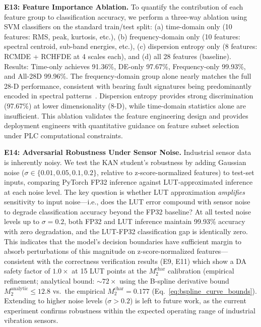 \documentclass[journal,onecolumn]{IEEEtran}
\begin{document}
\noindent\textbf{E13: Feature Importance Ablation.} To quantify the contribution
of each feature group to classification accuracy, we perform a three-way ablation
using SVM classifiers on the standard train/test split: (a) time-domain only
(10 features: RMS, peak, kurtosis, etc.), (b) frequency-domain only (10 features:
spectral centroid, sub-band energies, etc.), (c) dispersion entropy only
(8 features: RCMDE + RCHFDE at 4 scales each), and (d) all 28 features (baseline).
Results: Time-only achieves 91.36\%, DE-only 97.67\%, Frequency-only 99.93\%,
and All-28D 99.96\%. The frequency-domain group alone nearly matches the full
28-D performance, consistent with bearing fault signatures being predominantly
encoded in spectral patterns~\cite{zhang2017wdcnn}. Dispersion entropy provides
strong discrimination (97.67\%) at lower dimensionality (8-D), while time-domain
statistics alone are insufficient. This ablation validates the feature engineering
design and provides deployment engineers with quantitative guidance on feature
subset selection under PLC computational constraints.

\noindent\textbf{E14: Adversarial Robustness Under Sensor Noise.} Industrial
sensor data is inherently noisy. We test the KAN student's robustness by
adding Gaussian noise ($\sigma \in \{0.01, 0.05, 0.1, 0.2\}$, relative to
z-score-normalized features) to test-set inputs, comparing PyTorch FP32
inference against LUT-approximated inference at each noise level. The key
question is whether LUT approximation \textit{amplifies} sensitivity to input
noise---i.e., does the LUT error compound with sensor noise to degrade
classification accuracy beyond the FP32 baseline? At all tested noise levels
up to $\sigma = 0.2$, both FP32 and LUT inference maintain 99.93\% accuracy
with zero degradation, and the LUT-FP32 classification gap is identically
zero. This indicates that the model's decision boundaries have sufficient
margin to absorb perturbations of this magnitude on z-score-normalized
features---consistent with the correctness verification results (E9, E11) which
show a DA safety factor of $1.0\times$ at 15 LUT points at the
$M_2^{\text{char}}$ calibration (empirical refinement;
analytical bound: ${\sim}72\times$ using the B-spline derivative bound
$M_2^{\text{analytic}} \leq 12.8$ vs.\ the empirical
$M_2^{\text{char}} = 0.177$ (Eq.~\ref{eq:bspline_curve_bounds}).
Extending to
higher noise levels ($\sigma > 0.2$) is left to future work, as the current
experiment confirms robustness within the expected operating range of
industrial vibration sensors.
\end{document}
